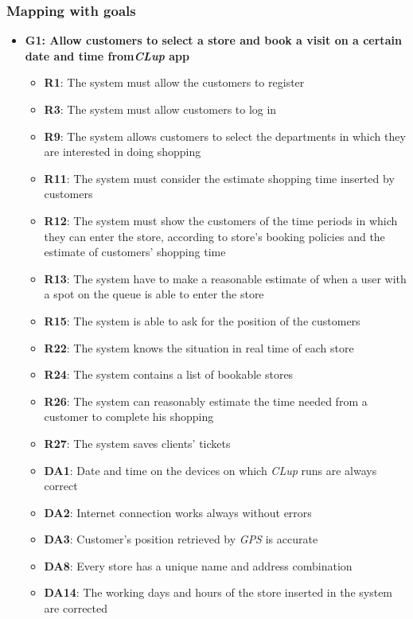 \documentclass{article}
\begin{document}
		\subsubsection{Mapping with goals}
			
			\begin{itemize}			

				\item {\bfseries G1: Allow customers to select a store and book a visit on a certain date and time
				from\emph{CLup} app}			

					\begin{itemize}
						
						\item {\bfseries R1}: The system must allow the customers to register
						\item {\bfseries R3}: The system must allow customers to log in
						\item {\bfseries R9}: The system allows customers to select the departments in which they are interested in doing shopping						\item {\bfseries R11}: The system must consider the estimate shopping time inserted by customers
						\item {\bfseries R12}: The system must show the customers of the time periods in which they can enter the store, according to store's booking policies and the estimate of customers' shopping time
						\item {\bfseries R13}: The system have to make a reasonable estimate of when a user with a spot on the queue is able to enter the store
						\item {\bfseries R15}: The system is able to ask for the position of the customers
						\item {\bfseries R22}: The system knows the situation in real time of each store 
						\item {\bfseries R24}: The system contains a list of bookable stores
						\item {\bfseries R26}: The system can reasonably estimate the time needed from a customer to complete his shopping
						\item {\bfseries R27}: The system saves clients' tickets \\	
									
						\item {\bfseries DA1}: Date and time on the devices on which \emph{CLup} runs are always correct
						\item {\bfseries DA2}: Internet connection works always without errors
						\item {\bfseries DA3}: Customer’s position retrieved by \emph{GPS} is accurate
						\item {\bfseries DA8}: Every store has a unique name and address combination
						\item {\bfseries DA14}: The working days and hours of the store inserted in the system are corrected
					

\end{itemize}
\end{itemize}
\end{document}
